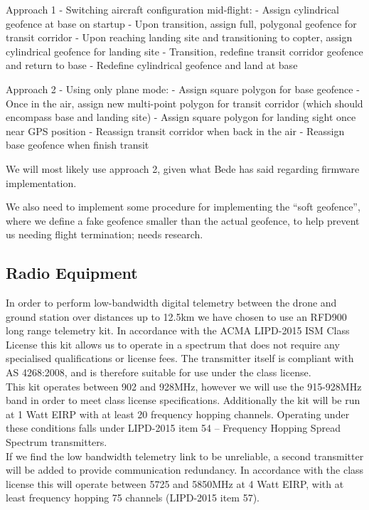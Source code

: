 Approach 1 - Switching aircraft configuration mid-flight:
- Assign cylindrical geofence at base on startup
- Upon transition, assign full, polygonal geofence for transit corridor
- Upon reaching landing site and transitioning to copter, assign cylindrical geofence for landing site
- Transition, redefine transit corridor geofence and return to base
- Redefine cylindrical geofence and land at base

Approach 2 - Using only plane mode:
- Assign square polygon for base geofence
- Once in the air, assign new multi-point polygon for transit corridor (which should encompass base and landing site)
- Assign square polygon for landing sight once near GPS position
- Reassign transit corridor when back in the air
- Reassign base geofence when finish transit

We will most likely use approach 2, given what Bede has said regarding firmware implementation.

We also need to implement some procedure for implementing the ``soft geofence'', where we define a fake geofence smaller than the actual geofence, to help prevent us needing flight termination; needs research.

\subsection{Radio Equipment}
In order to perform low-bandwidth digital telemetry between the drone and ground station over distances up to 12.5km we have chosen to use an RFD900 long range telemetry kit. In accordance with the ACMA LIPD-2015 ISM Class License this kit allows us to operate in a spectrum that does not require any specialised qualifications or license fees. The transmitter itself is compliant with AS 4268:2008, and is therefore suitable for use under the class license.\\

This kit operates between 902 and 928MHz, however we will use the 915-928MHz band in order to meet class license specifications.  Additionally the kit will be run at 1 Watt EIRP with at least 20 frequency hopping channels. Operating under these conditions falls under LIPD-2015 item 54 – Frequency Hopping Spread Spectrum transmitters.\\

If we find the low bandwidth telemetry link to be unreliable, a second transmitter will be added to provide communication redundancy. In accordance with the class license this will operate between 5725 and 5850MHz at 4 Watt EIRP, with at least frequency hopping 75 channels (LIPD-2015 item 57).